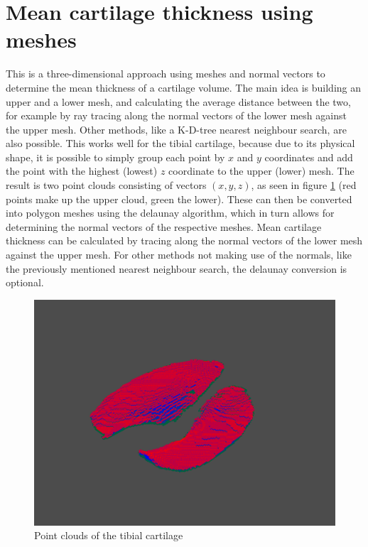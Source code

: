\section{Mean cartilage thickness using meshes}
\label{sec:Meshes}
This is a three-dimensional approach using meshes and normal vectors to determine the mean thickness of a cartilage volume. The main idea is building an upper and a lower mesh, and calculating the average distance between the two, for example by ray tracing along the normal vectors of the lower mesh against the upper mesh. Other methods, like a K-D-tree nearest neighbour search, are also possible. This works well for the tibial cartilage, because due to its physical shape, it is possible to simply group each point by $x$ and $y$ coordinates and add the point with the highest (lowest) $z$ coordinate to the upper (lower) mesh. The result is two point clouds consisting of vectors $(x, y, z)$, as seen in figure \ref{fig:tibial_point_cloud} (red points make up the upper cloud, green the lower). These can then be converted into polygon meshes using the delaunay algorithm, which in turn allows for determining the normal vectors of the respective meshes. Mean cartilage thickness can be calculated by tracing along the normal vectors of the lower mesh against the upper mesh. For other methods not making use of the normals, like the previously mentioned nearest neighbour search, the delaunay conversion is optional. 
\begin{figure}[htb!]
	\centering
	\includegraphics[width=\linewidth]{./figures/s2}
	\caption{Point clouds of the tibial cartilage}
	\label{fig:tibial_point_cloud}
\end{figure}

